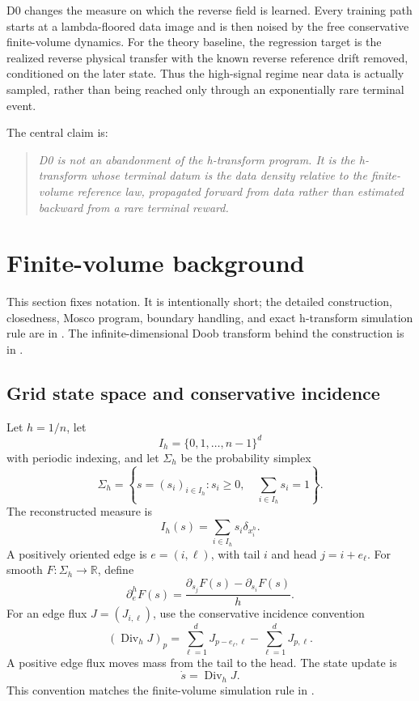 \documentclass[11pt]{article}
\numberwithin{equation}{section}
\newcommand{\R}{\mathbb R}
\newcommand{\SigmaH}{\Sigma_h}
\newcommand{\Ih}{I_h}
\newcommand{\dive}{\operatorname{Div}_h}
\newcommand{\1}{\mathbf 1}
\begin{document}
D0 changes the measure on which the reverse field is learned.  Every training path starts at a lambda-floored data image and is then noised by the free conservative finite-volume dynamics.  For the theory baseline, the regression target is the realized reverse physical transfer with the known reverse reference drift removed, conditioned on the later state.  Thus the high-signal regime near data is actually sampled, rather than being reached only through an exponentially rare terminal event.

The central claim is:
\begin{quote}
\emph{D0 is not an abandonment of the h-transform program.  It is the h-transform whose terminal datum is the data density relative to the finite-volume reference law, propagated forward from data rather than estimated backward from a rare terminal reward.}
\end{quote}

\section{Finite-volume background}

This section fixes notation.  It is intentionally short; the detailed construction, closedness, Mosco program, boundary handling, and exact h-transform simulation rule are in \cite{eulerian-manuscript}.  The infinite-dimensional Doob transform behind the construction is in \cite{main-manuscript}.

\subsection{Grid state space and conservative incidence}

Let \(h=1/n\), let
\[
  \Ih = \{0,1,\ldots,n-1\}^d
\]
with periodic indexing, and let \(\SigmaH\) be the probability simplex
\[
  \SigmaH=\left\{s=(s_i)_{i\in\Ih}: s_i\ge 0,\quad \sum_{i\in\Ih}s_i=1\right\}.
\]
The reconstructed measure is
\[
  I_h(s)=\sum_{i\in\Ih}s_i\delta_{x_i^h}.
\]
A positively oriented edge is \(e=(i,\ell)\), with tail \(i\) and head \(j=i+e_\ell\).  For smooth \(F:\SigmaH\to\R\), define
\begin{equation}\label{eq:edge-derivative-d0}
  \partial_e^h F(s)=\frac{\partial_{s_j}F(s)-\partial_{s_i}F(s)}{h}.
\end{equation}
For an edge flux \(J=(J_{i,\ell})\), use the conservative incidence convention
\begin{equation}\label{eq:incidence-d0}
  (\dive J)_p=\sum_{\ell=1}^d J_{p-e_\ell,\ell}-\sum_{\ell=1}^d J_{p,\ell}.
\end{equation}
A positive edge flux moves mass from the tail to the head.  The state update is
\[
  \dot s=\dive J.
\]
This convention matches the finite-volume simulation rule in \cite[Sec.~7.4]{eulerian-manuscript}.
\end{document}
